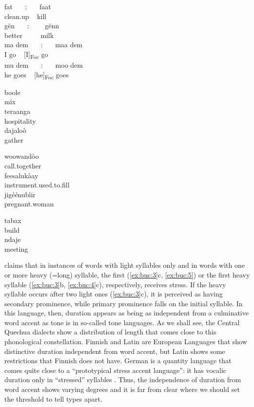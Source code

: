 \documentclass[output=paper]{LSP/langsci}
\begin{document}
\ea
    \label{ex:buc:2}
  \ea
  \gll fat~~~ :~~~ faat  \\
    clean.up ~ kill \\  
  \ex
    gën~~~ :~~~~ gënn\\
    better ~~~~ milk\\
  \ex
  \gll ma dem~~~ :~~~ maa dem                   \\
	I go ~ [I]\textsubscript{Foc} go    \\
  \ex
  \gll mu dem~~~  :~~~ moo dem\\
      he goes  ~  [he]\textsubscript{Foc} goes\\
     
  \z
\z


\ea%
    \label{ex:buc:3}
  \ea
  \gll {}boole\\
  mix\\
  \ex
  \gll teraanga \\
  hospitality\\
  \ex
  \gll {}dajaloò\\
  gather\\
  \z
\z

\ea%
    \label{ex:buc:4}
    \ea
    \gll{}woowandòo  \\
    call.together  \\
    \ex 
    \gll {}feesalukàay   \\
    instrument.used.to.fill\\
    \ex
    \gll jigéénubìir \\
   pregnant.woman \\
\z
\z

\ea%
    \label{ex:buc:5}
    \ea
    \gll {}tabax \\
	build \\
    \ex
    \gll {}ndaje\\
    meeting  \\
    \z 
\z 

\citet{Ka1989,Ka1994} claims that in instances of words with light syllables only and in words with one or more heavy (=long) syllable, the first (\ref{ex:buc:3}c, \ref{ex:buc:5}) or the first heavy syllable (\ref{ex:buc:3}b, \ref{ex:buc:4}c), respectively, receives stress. If the heavy syllable occurs after two light ones (\ref{ex:buc:3}c), it is perceived as having secondary prominence, while primary prominence falls on the initial syllable. In this language, then, duration appears as being as independent from a culminative word accent as tone is in so-called tone languages. As we shall see, the Central Quechua dialects show a distribution of length that comes close to this phonological constellation. Finnish and Latin are European Languages that show distinctive duration independent from word accent, but Latin shows some restrictions that Finnish does not have. German is a quantity language that comes quite close to a ``prototypical stress accent language'': it has vocalic duration only in ``stressed'' syllables \citep{Becker1996}. Thus, the independence of duration from word accent shows varying degrees and it is far from clear where we should set the threshold to tell types apart.
\end{document}
